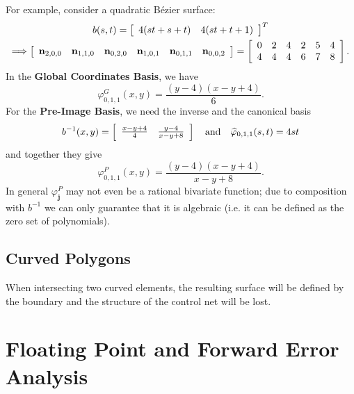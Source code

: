 \noindent For example, consider a quadratic B\'{e}zier surface:
\begin{gather}
b(s, t) = \left[ \begin{array}{c c}
    4 (s t + s + t) & 4 (s t + t + 1)
  \end{array}\right]^T \\
\Longrightarrow
\left[ \begin{array}{c c c c c c}
    \mathbf{n}_{2, 0, 0} &
    \mathbf{n}_{1, 1, 0} &
    \mathbf{n}_{0, 2, 0} &
    \mathbf{n}_{1, 0, 1} &
    \mathbf{n}_{0, 1, 1} &
    \mathbf{n}_{0, 0, 2}
  \end{array}\right] = \left[ \begin{array}{c c c c c c}
    0 & 2 & 4 & 2 & 5 & 4 \\
    4 & 4 & 4 & 6 & 7 & 8
  \end{array}\right].
\end{gather}
In the \textbf{Global Coordinates Basis}, we have
\begin{equation}
\varphi^{G}_{0, 1, 1}(x, y) = \frac{(y - 4) (x - y + 4)}{6}.
\end{equation}
For the \textbf{Pre-Image Basis}, we need the inverse
and the canonical basis
\begin{equation}
b^{-1}(x, y) = \left[ \begin{array}{c c}
    \frac{x - y + 4}{4} & \frac{y - 4}{x - y + 8}
  \end{array}\right] \quad \text{and} \quad
\widehat{\varphi}_{0, 1, 1}(s, t) = 4 s t
\end{equation}
and together they give
\begin{equation}
\varphi^{P}_{0, 1, 1}(x, y) = \frac{(y - 4) (x - y + 4)}{x - y + 8}.
\end{equation}
In general \(\varphi_{\mathbf{j}}^P\) may not even be a rational bivariate
function; due to composition with \(b^{-1}\) we can only guarantee that
it is algebraic (i.e. it can be defined as the zero set of polynomials).

\subsection{Curved Polygons}

When intersecting two curved elements, the resulting surface will
be defined by the boundary and the structure of the control net will
be lost.

\section{Floating Point and Forward Error Analysis}

